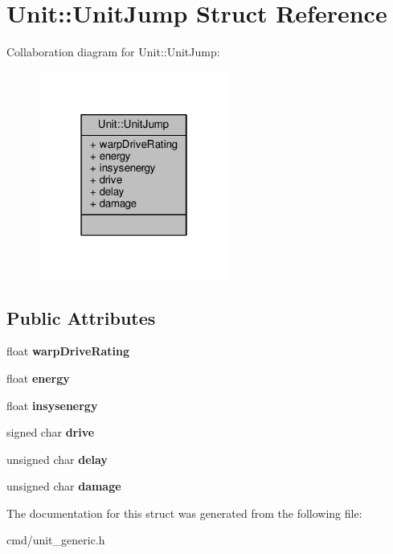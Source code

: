 \hypertarget{structUnit_1_1UnitJump}{}\section{Unit\+:\+:Unit\+Jump Struct Reference}
\label{structUnit_1_1UnitJump}


Collaboration diagram for Unit\+:\+:Unit\+Jump\+:
\nopagebreak
\begin{figure}[H]
\begin{center}
\leavevmode
\includegraphics[width=178pt]{d1/d2a/structUnit_1_1UnitJump__coll__graph}
\end{center}
\end{figure}
\subsection*{Public Attributes}
\begin{DoxyCompactItemize}
\item 
float {\bfseries warp\+Drive\+Rating}\hypertarget{structUnit_1_1UnitJump_aab84f6163966da1e1804c8720e514ee2}{}\label{structUnit_1_1UnitJump_aab84f6163966da1e1804c8720e514ee2}

\item 
float {\bfseries energy}\hypertarget{structUnit_1_1UnitJump_ad949dfa0af9c6b6385a7d6950e4ed5ad}{}\label{structUnit_1_1UnitJump_ad949dfa0af9c6b6385a7d6950e4ed5ad}

\item 
float {\bfseries insysenergy}\hypertarget{structUnit_1_1UnitJump_abaa3a74239edbb7b19bed73c759bee14}{}\label{structUnit_1_1UnitJump_abaa3a74239edbb7b19bed73c759bee14}

\item 
signed char {\bfseries drive}\hypertarget{structUnit_1_1UnitJump_aac6a3f755e47251364c36612e2ce1e90}{}\label{structUnit_1_1UnitJump_aac6a3f755e47251364c36612e2ce1e90}

\item 
unsigned char {\bfseries delay}\hypertarget{structUnit_1_1UnitJump_a3ceb78a8ad8a77371bbbdcdf385ebac9}{}\label{structUnit_1_1UnitJump_a3ceb78a8ad8a77371bbbdcdf385ebac9}

\item 
unsigned char {\bfseries damage}\hypertarget{structUnit_1_1UnitJump_a092a0bcfef460ee04ba1d42957423a07}{}\label{structUnit_1_1UnitJump_a092a0bcfef460ee04ba1d42957423a07}

\end{DoxyCompactItemize}


The documentation for this struct was generated from the following file\+:\begin{DoxyCompactItemize}
\item 
cmd/unit\+\_\+generic.\+h\end{DoxyCompactItemize}
